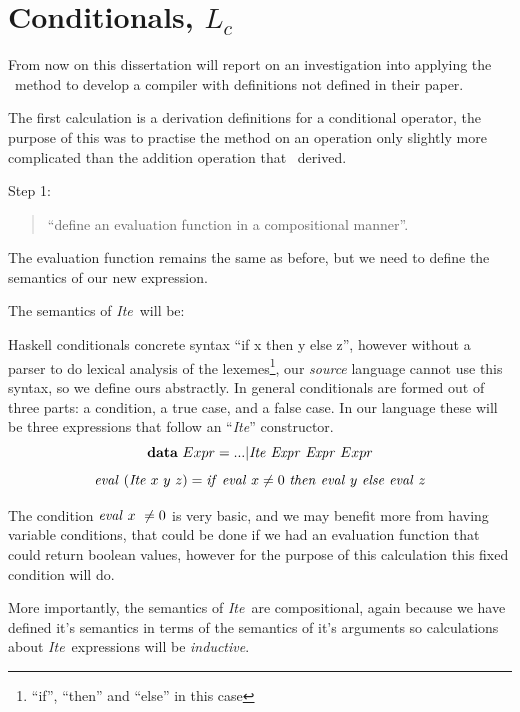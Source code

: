 \documentclass {article}
\begin{document}
\pagebreak
\section{Conditionals, $L_c$} \label{langcond}

From now on this dissertation will report on an
investigation into applying the \BH\ method to develop a compiler
with definitions not defined in their paper\cite{bandh}.

The first calculation is a derivation
definitions for a conditional operator,
the purpose of this was to practise the method
on an operation only slightly more complicated than
the addition operation that \BH\ derived.

\newcommand{\ite}{\textit{Ite}}
\newcommand{\Ite}{\mathit{Ite\ }}
\newcommand{\String}{\mathit{String\ }}

Step 1: 
\begin{quote}
``define an evaluation function in a compositional manner''.
\end{quote}
The evaluation function remains 
the same as before,
but we need to define 
the semantics of our new expression.

\noindent The semantics of \ite\ will be:
\newcommand{\ifff}{\mathit{if\ }}
\newcommand{\tthen}{\mathit{then\ }}
\newcommand{\eelse }{\mathit{else\ }}

Haskell conditionals concrete
syntax ``if  x then y else z'',
however without a parser to do
lexical analysis\cite[chapter 2.2]{dragon} of the lexemes\footnote{
``if'', ``then'' and ``else'' in this case},
our \emph{source} language cannot use this
syntax, so we define ours abstractly.
In general conditionals are formed out of three parts:
a condition, a true case, and a false case.
In our language these will be three expressions
that follow an ``\ite'' constructor.
\[ \textbf{data}\ Expr = ... | \Ite \Expr \Expr Expr \]
\begin{equation}
\evalf (\Ite x\ y\ z) \\
	= \ifff \evalf x \not= 0\ 
		\tthen \evalf y\ \eelse  \evalf z 
			\label{evalite}
\end{equation}

The condition $\mathit{eval\ } x\ \not= 0$ is very basic,
and we may benefit more from having variable conditions,
that could be done if we had an evaluation function 
that could return boolean values, 
however for the purpose of this calculation
this fixed condition will do.

More importantly, the semantics of \ite\
are compositional, 
again because we have defined it's
semantics in terms of the semantics of 
it's arguments so
calculations about \ite\ expressions
will be \emph{inductive}.
\end{document}
